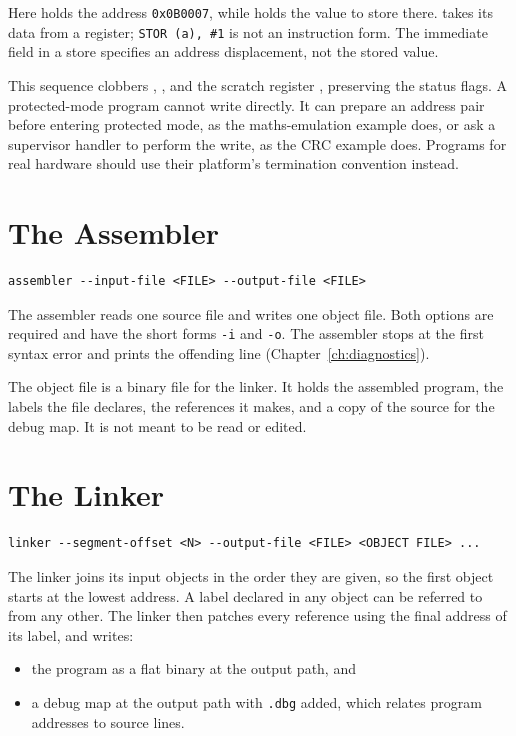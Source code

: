 Here  holds the address \texttt{0x0B0007}, while  holds the value  to store there.
 takes its data from a register; \texttt{STOR (a), \#1} is not an instruction form. The immediate field
in a store specifies an address displacement, not the stored value.

This sequence clobbers , , and the scratch register , preserving the status flags. A
protected-mode program cannot write  directly. It can prepare an address pair before entering protected mode,
as the maths-emulation example does, or ask a supervisor handler to perform the write, as the CRC example does.
Programs for real hardware should use their platform's termination convention instead.

\section{The Assembler}

\begin{lstlisting}[language={}]
assembler --input-file <FILE> --output-file <FILE>
\end{lstlisting}

The assembler reads one source file and writes one object file. Both options are required and have the short forms
\texttt{-i} and \texttt{-o}. The assembler stops at the first syntax error and prints the offending line
(Chapter~\ref{ch:diagnostics}).

The object file is a binary file for the linker. It holds the assembled program, the labels the file declares, the
references it makes, and a copy of the source for the debug map. It is not meant to be read or edited.

\section{The Linker}

\begin{lstlisting}[language={}]
linker --segment-offset <N> --output-file <FILE> <OBJECT FILE> ...
\end{lstlisting}

The linker joins its input objects in the order they are given, so the first object starts at the lowest address. A
label declared in any object can be referred to from any other. The linker then patches every reference using the final
address of its label, and writes:

\begin{itemize}
	\item the program as a flat binary at the output path, and
	\item a debug map at the output path with \texttt{.dbg} added, which relates program addresses to source lines.
\end{itemize}

